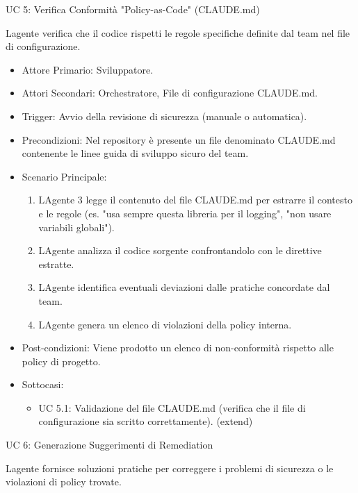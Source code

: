 \documentclass[12pt, a4paper]{article}
\begin{document}
UC 5: Verifica Conformità "Policy-as-Code" (CLAUDE.md)

L\textquotesingle agente verifica che il codice rispetti le regole
specifiche definite dal team nel file di configurazione.

\begin{itemize}
\item
  Attore Primario: Sviluppatore.
\item
  Attori Secondari: Orchestratore, File di configurazione CLAUDE.md.
\item
  Trigger: Avvio della revisione di sicurezza (manuale o automatica).
\item
  Precondizioni: Nel repository è presente un file denominato CLAUDE.md
  contenente le linee guida di sviluppo sicuro del team.
\item
  Scenario Principale:

  \begin{enumerate}
  \item
    L\textquotesingle Agente 3 legge il contenuto del file CLAUDE.md per
    estrarre il contesto e le regole (es. "usa sempre questa libreria
    per il logging", "non usare variabili globali").
  \item
    L\textquotesingle Agente analizza il codice sorgente confrontandolo
    con le direttive estratte.
  \item
    L\textquotesingle Agente identifica eventuali deviazioni dalle
    pratiche concordate dal team.
  \item
    L\textquotesingle Agente genera un elenco di violazioni della policy
    interna.
  \end{enumerate}
\item
  Post-condizioni: Viene prodotto un elenco di non-conformità rispetto
  alle policy di progetto.
\item
  Sottocasi:

  \begin{itemize}
  \item
    UC 5.1: Validazione del file CLAUDE.md (verifica che il file di
    configurazione sia scritto correttamente). (extend)
  \end{itemize}
\end{itemize}

UC 6: Generazione Suggerimenti di Remediation

L\textquotesingle agente fornisce soluzioni pratiche per correggere i
problemi di sicurezza o le violazioni di policy trovate.
\end{document}
